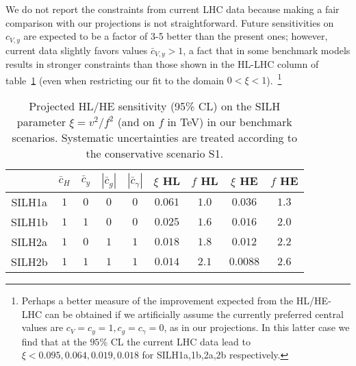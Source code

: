 We do not report the constraints from current LHC data because making a fair comparison with our projections is not straightforward. Future sensitivities on $c_{V,y}$ are expected to be a factor of 3-5 better than the present ones; however, current data slightly favors values $\bar c_{V,y}>1$, a fact that in some benchmark models results in stronger constraints than those shown in the HL-LHC column of table~\ref{benchark} (even when restricting our fit to the domain $0<\xi<1$).~\footnote{Perhaps a better measure of the improvement expected from the HL/HE-LHC can be obtained if we artificially assume the currently preferred central values are $c_V=c_y=1, c_g=c_\gamma=0$, as in our projections. In this latter case we find that at the $95\%$ CL the current LHC data lead to $\xi<0.095, 0.064, 0.019, 0.018$ for SILH1a,1b,2a,2b respectively.}





\begin{table}[t]
\caption{\small Projected HL/HE sensitivity (95\% CL) on the SILH parameter $\xi=v^2/f^2$ (and on $f$ in TeV) in our benchmark scenarios. Systematic uncertainties are treated according to the conservative scenario S1.
\label{benchark}}
\begin{center}
{
\begin{tabular}{c|cccc||cc|cc} 
\rule{0pt}{1.2em}%

& $\bar c_H$ & $\bar c_y$  & $|\bar c_{g}|$ & $|\bar c_{\gamma}|$ & $\xi$ HL & $f$ HL &  $\xi$ HE & $f$ HE \\
\hline
\hline
SILH1a & $1$ & $0$ & $0$ & $0$ & $0.061$ & $1.0$ & $0.036$ & $1.3$ \\
SILH1b &$1$ & $1$ & $0$ & $0$ & $0.025$ & $1.6$ & $0.016$ & $2.0$ \\
\hline
SILH2a &$1$ & $0$ & $1$ & $1$ & $0.018$ & $1.8$ & $0.012$ & $2.2$\\
SILH2b & $1$ & $1$ & $1$ & $1$ & $0.014$ & $2.1$ & $0.0088$ & $2.6$ \\
\end{tabular}
}
\end{center}
\end{table}





